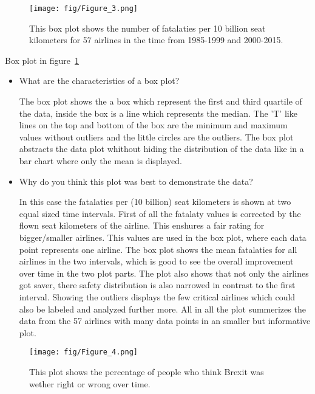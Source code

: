 \documentclass[a4paper, 11pt]{article}
\begin{document}
\newpage

\begin{figure}[h!] 
    \centering
    \texttt{[image: fig/Figure\_3.png]}
    \caption{This box plot shows the number of fatalaties per 10 billion seat kilometers for 57 airlines in the time from 1985-1999 and 2000-2015.}
    \label{fig:airline}
\end{figure}

Box plot in figure~\ref{fig:airline}

\begin{itemize}
    \item What are the characteristics of a box plot?

    The box plot shows the a box which represent the first and third quartile of the data, inside the box is a line which represents the median. 
    The 'T' like lines on the top and bottom of the box are the minimum and maximum values without outliers and the little circles are the outliers. 
    The box plot abstracts the data plot whithout hiding the distribution of the data like in a bar chart where only the mean is displayed.

    \item Why do you think this plot was best to demonstrate the data?
    
    In this case the fatalaties per (10 billion) seat kilometers is shown at two equal sized time intervals. 
    First of all the fatalaty values is corrected by the flown seat kilometers of the airline. This enshures a fair rating for bigger/smaller airlines. 
    This values are used in the box plot, where each data point represents one airline. 
    The box plot shows the mean fatalaties for all airlines in the two intervals, which is good to see the overall improvement over time in the two plot parts. 
    The plot also shows that not only the airlines got saver, there safety distribution is also narrowed in contrast to the first interval. 
    Showing the outliers displays the few critical airlines which could also be labeled and analyzed further more.
    All in all the plot summerizes the data from the 57 airlines with many data points in an smaller but informative plot.
\end{itemize}


\begin{figure}[h!] 
    \centering
    \texttt{[image: fig/Figure\_4.png]}
    \caption{This plot shows the percentage of people who think Brexit was wether right or wrong over time.}
    \label{fig:brexit}
\end{figure}
\end{document}
